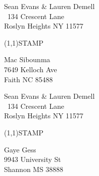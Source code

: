 \documentclass[12pt]{article}
\begin{document}
\clearpage

\begin{minipage}{.5\linewidth} \noindent
Sean Evans \& Lauren Demell\\\ 
134 Crescent Lane\\ 
Roslyn Heights NY 11577
\end{minipage}
\begin{minipage}{.5\linewidth \hspace{-.2in} \vspace{-.3in}}
\begin{flushright}
\framebox(1,1){STAMP}
\end{flushright}
\end{minipage}

\begin{center} \begin{Huge} \vspace*{\fill}
Mac Sibounma\\
7649 Kelloch Ave\\
Faith NC 85488\\
\vspace{\fill} \end{Huge} \end{center}

\clearpage

\begin{minipage}{.5\linewidth} \noindent
Sean Evans \& Lauren Demell\\\ 
134 Crescent Lane\\ 
Roslyn Heights NY 11577
\end{minipage}
\begin{minipage}{.5\linewidth \hspace{-.2in} \vspace{-.3in}}
\begin{flushright}
\framebox(1,1){STAMP}
\end{flushright}
\end{minipage}

\begin{center} \begin{Huge} \vspace*{\fill}
Gaye Gess\\
9943 University St\\
Shannon MS 38888\\
\vspace{\fill} \end{Huge} \end{center}

\clearpage
\end{document}
